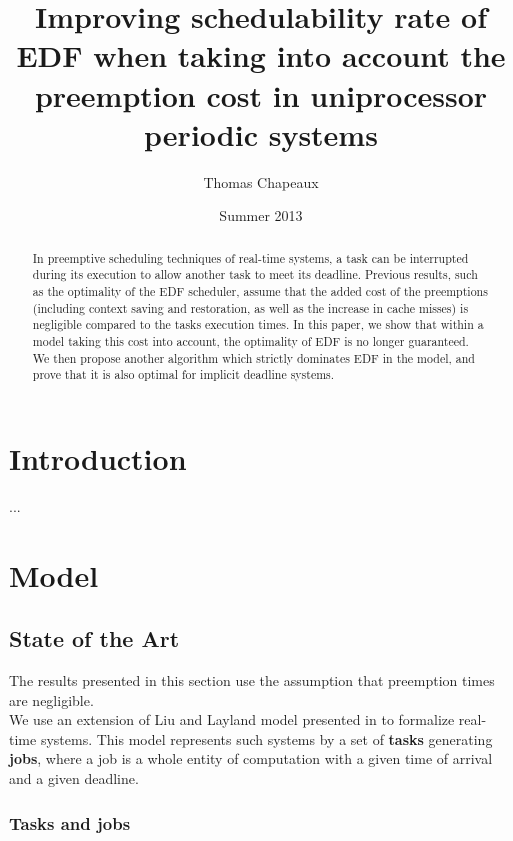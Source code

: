 \documentclass[a4paper,10pt]{article}
\title{Improving schedulability rate of EDF when taking into account the preemption cost in uniprocessor periodic systems}
\author{Thomas Chapeaux}
\date{Summer 2013}
\begin{document}
\maketitle

\tableofcontents

\newpage

\begin{abstract}

In preemptive scheduling techniques of real-time systems, a task can be interrupted during its execution to allow another task to meet its deadline. Previous results, such as the optimality of the EDF scheduler, assume that the added cost of the preemptions (including context saving and restoration, as well as the increase in cache misses) is negligible compared to the tasks execution times. In this paper, we show that within a model taking this cost into account, the optimality of EDF is no longer guaranteed. We then propose another algorithm which strictly dominates EDF in the model, and prove that it is also optimal for implicit deadline systems.

\end{abstract}

\newpage

\section{Introduction}

...

\section{Model}

    \subsection{State of the Art}

        The results presented in this section use the assumption that preemption times are negligible.\\

        We use an extension of Liu and Layland model presented in \cite{Liu:2000:RS:518501} to formalize real-time systems. This model represents such systems by a set of \textbf{tasks} generating \textbf{jobs}, where a job is a whole entity of computation with a given time of arrival and a given deadline.\\

        \subsubsection{Tasks and jobs}
\end{document}
